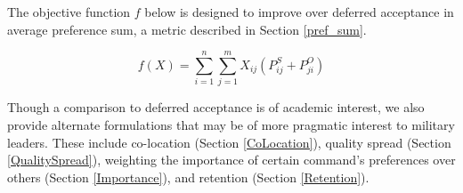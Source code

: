 The objective function $f$ below is designed to improve over deferred acceptance in average preference sum, a metric described in Section \ref{pref_sum}. 

\[f(X) = \sum_{i=1}^n \sum_{j=1}^m X_{ij}(P^S_{ij} + P^O_{ji})\]

Though a comparison to deferred acceptance is of academic interest, we also provide alternate formulations that may be of more pragmatic interest to military leaders. These include co-location (Section \ref{CoLocation}), quality spread (Section \ref{QualitySpread}), weighting the importance of certain command's preferences over others (Section \ref{Importance}), and retention (Section \ref{Retention}).
